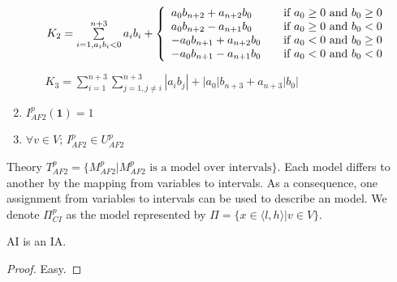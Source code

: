 \begin{enumerate}
\begin{itemize}
$K_2 = \sum\limits_{i=1,a_ib_i<0}^{n+3}a_ib_i + \left\{ 
  \begin{array}{l l}
    a_0b_{n+2} + a_{n+2}b_0 & \quad \text{if } a_0 \ge 0 \text{ and } b_0 \ge 0\\
    a_0b_{n+2} - a_{n+1}b_0 & \quad \text{if } a_0 \ge 0 \text{ and } b_0 < 0\\
    -a_0b_{n+1} + a_{n+2}b_0 & \quad \text{if } a_0 < 0 \text{ and } b_0 \ge 0\\
    -a_0b_{n+1} - a_{n+1}b_0 & \quad \text{if } a_0 < 0 \text{ and } b_0 < 0\\
  \end{array} \right.$  

$K_3 = \sum\limits_{i=1}^{n+3}\sum\limits_{j=1,j \neq i}^{n+3}|a_ib_j| + |a_0|b_{n+3} + a_{n+3}|b_0|$
\end{itemize}
\item $I^p_{AF2}(\mathbf{1}) = 1$
\item $\forall v \in V$; $I^p_{AF2} \in U^p_{AF2}$
\end{enumerate}
Theory $T^p_{AF2} = \{M^p_{AF2}| M^p_{AF2} \text{ is a model over intervals}\}$. Each model differs to another by the mapping from variables to intervals. As a consequence, one assignment from variables to intervals can be used to describe an model. We denote $\Pi^p_{CI}$ as the model represented by $\Pi = \{x \in \langle l, h\rangle  | v \in V\}$. 
\begin{theorem}
AI is an IA.
\end{theorem}
\begin{proof}
Easy.
\end{proof}

